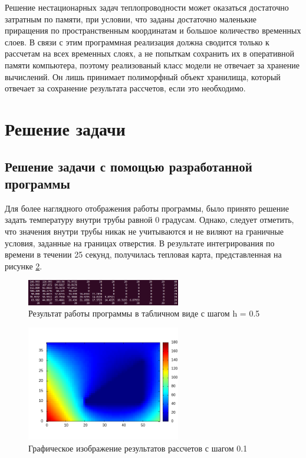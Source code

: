 \documentclass[12pt, a4paper]{article}
\begin{document}
	Решение нестационарных задач теплопроводности может оказаться достаточно затратным по памяти, при условии, что заданы достаточно маленькие приращения по пространственным координатам и большое количество временных слоев. В связи с этим программная реализация должна сводится только к рассчетам на всех временных слоях, а не попыткам сохранить их в оперативной памяти компьютера, поэтому реализованый класс модели не отвечает за хранение вычислений. Он лишь принимает полиморфный объект хранилища, который отвечает за сохранение результата рассчетов, если это необходимо.
	
	\section{Решение задачи}
	\subsection{Решение задачи с помощью разработанной программы}
	
	Для более наглядного отображения работы программы, было принято решение задать температуру внутри трубы равной 0 градусам. Однако, следует отметить, что значения внутри трубы никак не учитываются и не виляют на граничные условия, заданные на границах отверстия. В результате интегрирования по времени в течении 25 секунд, получилась тепловая карта, представленная на рисунке \ref{fig:pic2}. 
	
	\begin{figure}[h]
		\centering    %
		\includegraphics[width=0.6\textwidth]{static/TableResult.png}
		\caption{Результат работы программы в табличном виде с шагом h = 0.5} %
		\label{fig:pic3} %
	\end{figure}
	
	\begin{figure}[h]
		\centering    %
		\includegraphics[width=0.6\textwidth]{static/heatmap.png}
		\caption{Графическое изображение результатов рассчетов с шагом 0.1} %
		\label{fig:pic2} %
	\end{figure}
\end{document}
